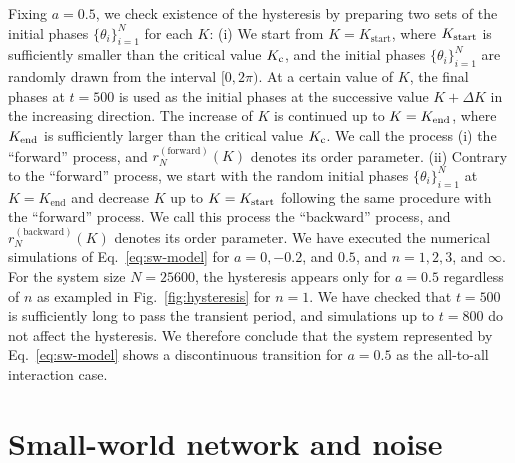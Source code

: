 Fixing $a=0.5$, we check existence of the hysteresis
by preparing two sets of the initial phases $\{\theta_{i}\}_{i=1}^{N}$
for each $K$:
(i) We start from $K=K_{\mathrm{start}}$,
where $K_{\rm start}$ is sufficiently smaller than the critical value $K_{\rm c}$,
and the initial phases $\{\theta_{i}\}_{i=1}^{N}$ are randomly drawn
from the interval $[0,2\pi)$.
At a certain value of $K$, the final phases at $t=500$ is used
as the initial phases at the successive value $K+\Delta K$
in the increasing direction.
The increase of $K$ is continued up to $K=K_{\rm end}$,
where $K_{\rm end}$ is sufficiently larger than the critical value $K_{\rm c}$.
%    
We call the process (i) the ``forward'' process, and $r_{N}^{(\mathrm{forward})}(K)$ denotes its order parameter.
(ii) Contrary to the ``forward'' process,
we start with the random initial phases $\{\theta_{i}\}_{i=1}^{N}$
at $K=K_{\mathrm{end}}$
and decrease $K$ up to $K=K_{\rm start}$
following the same procedure with the ``forward'' process.
We call this process the ``backward'' process, and $r_{N}^{(\mathrm{backward})}(K)$ denotes its order parameter.
We have executed the numerical simulations of Eq.~\eqref{eq:sw-model}
for $a=0,-0.2$, and $0.5$, and $n=1,2,3$, and $\infty$.
For the system size $N=25600$,
the hysteresis appears only for $a=0.5$ regardless of $n$
as exampled in Fig.~\ref{fig:hysteresis} for $n=1$.
We have checked that $t=500$ is sufficiently long
to pass the transient period,
and simulations up to $t=800$ do not affect the hysteresis.
We therefore conclude that the system represented by Eq.~\eqref{eq:sw-model}
shows a discontinuous transition for $a=0.5$ as the all-to-all interaction case.


\section{Small-world network and noise}
\label{sec:SW-noise}

